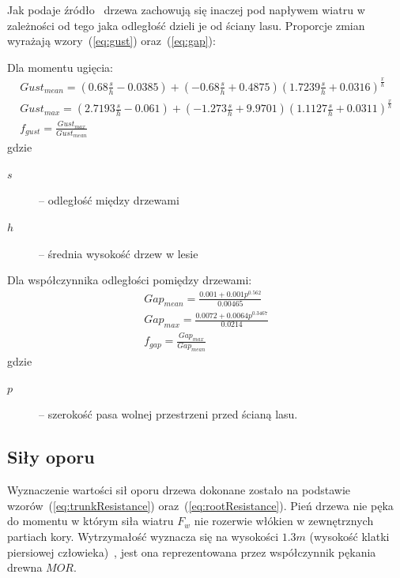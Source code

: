 Jak podaje źródło~\cite{hp_hwind} drzewa zachowują się inaczej pod napływem wiatru w zależności od tego jaka odległość dzieli je od ściany lasu. Proporcje zmian wyrażają wzory~(\ref{eq:gust}) oraz~(\ref{eq:gap}):

Dla momentu ugięcia:
\begin{equation}
\label{eq:gust}
 \begin{array}{c}
	Gust_{mean} = (0.68 \frac{s}{h} - 0.0385) + (-0.68\frac{s}{h} + 0.4875)(1.7239\frac{s}{h} + 0.0316)^{\frac{x}{h}} \\
	Gust_{max} = (2.7193\frac{s}{h} - 0.061) + (-1.273\frac{s}{h} + 9.9701)(1.1127\frac{s}{h} + 0.0311)^{\frac{x}{h}} \\
	f_{gust} = \frac{Gust_{max}}{Gust_{mean}}
  \end{array} 
\end{equation}
gdzie
\begin{description}
	\item[$s$] -- odległość między drzewami
	\item[$h$] -- średnia wysokość drzew w lesie
\end{description}

Dla współczynnika odległości pomiędzy drzewami:
\begin{equation}
\label{eq:gap}
\begin{array}{c}
	Gap_{mean} = \frac{0.001 + 0.001p^{0.562}}{0.00465} \\
	Gap_{max} = \frac{0.0072 + 0.0064 p^{0.3467}}{0.0214} \\
	f_{gap} = \frac{Gap_{max}}{Gap_{mean}}
\end{array} 
\end{equation}
gdzie
\begin{description}
	\item[$p$] -- szerokość pasa wolnej przestrzeni przed ścianą lasu.
\end{description}

\subsection{Siły oporu}

Wyznaczenie wartości sił oporu drzewa dokonane zostało na podstawie wzorów~(\ref{eq:trunkResistance}) oraz~(\ref{eq:rootResistance}).
Pień drzewa nie pęka do momentu w którym siła wiatru $F_w$ nie rozerwie włókien w zewnętrznych partiach kory. Wytrzymałość wyznacza
się na wysokości $1.3m$ (wysokość klatki piersiowej człowieka)~\cite{hpsk_hwind}, jest ona reprezentowana przez współczynnik pękania drewna $MOR$.

